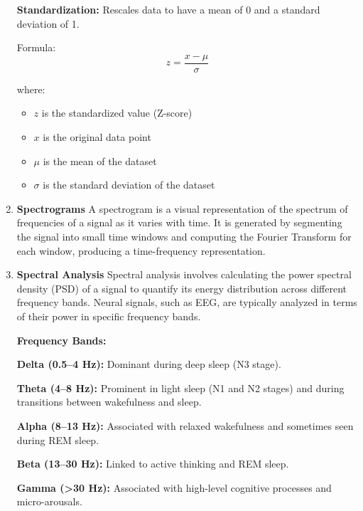 \documentclass[a4paper,12pt,twoside]{article}
\begin{document}
\begin{enumerate}
        \textbf{Standardization:}
        Rescales data to have a mean of 0 and a standard deviation of 1.
        
        Formula:\begin{equation}
        z = \frac{x - \mu}{\sigma}                      \label{eq:standardization}
                    \end{equation}
        
        where:
        \begin{itemize}
            \item $z$ is the standardized value (Z-score)
            \item $x$ is the original data point 
            \item $\mu$ is the mean of the dataset
            \item $\sigma$ is the standard deviation of the dataset
        \end{itemize}


        \item \textbf{Spectrograms}
        A spectrogram is a visual representation of the spectrum of frequencies of a signal as it varies with time. It is generated by segmenting the signal into small time windows and computing the Fourier Transform for each window, producing a time-frequency representation.

        \item \textbf{Spectral Analysis}
        Spectral analysis involves calculating the power spectral density (PSD) of a signal to quantify its energy distribution across different frequency bands. Neural signals, such as EEG, are typically analyzed in terms of their power in specific frequency bands.
        
        \textbf{Frequency Bands:}
        
        \textbf{Delta (0.5–4 Hz):} Dominant during deep sleep (N3 stage).
        
        \textbf{Theta (4–8 Hz):} Prominent in light sleep (N1 and N2 stages) and during transitions between wakefulness and sleep.
        
        \textbf{Alpha (8–13 Hz):} Associated with relaxed wakefulness and sometimes seen during REM sleep.
        
        \textbf{Beta (13–30 Hz):} Linked to active thinking and REM sleep.
        
        \textbf{Gamma (>30 Hz):} Associated with high-level cognitive processes and micro-arousals.


\end{enumerate}
\end{document}
